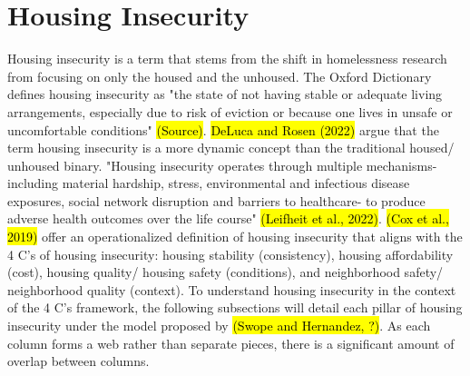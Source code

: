 \section{Housing Insecurity}
Housing insecurity is a term that stems from the shift in homelessness research from focusing on only the housed and the unhoused. The Oxford Dictionary defines housing insecurity as "the state of not having stable or adequate living arrangements, especially due to risk of eviction or because one lives in unsafe or uncomfortable conditions" \hl{(Source)}. \hl{DeLuca and Rosen (2022)} argue that the term housing insecurity is a more dynamic concept than the traditional housed/ unhoused binary. "Housing insecurity operates through multiple mechanisms-including material hardship, stress, environmental and infectious disease exposures, social network disruption and barriers to healthcare- to produce adverse health outcomes over the life course" \hl{(Leifheit et al., 2022)}. \hl{(Cox et al., 2019)} offer an operationalized definition of housing insecurity that aligns with the 4 C's of housing insecurity: housing stability (consistency), housing affordability (cost), housing quality/ housing safety (conditions), and neighborhood safety/ neighborhood quality (context). To understand housing insecurity in the context of the 4 C's framework, the following subsections will detail each pillar of housing insecurity under the model proposed by \hl{(Swope and Hernandez, ?)}. As each column forms a web rather than separate pieces, there is a significant amount of overlap between columns. 
 
